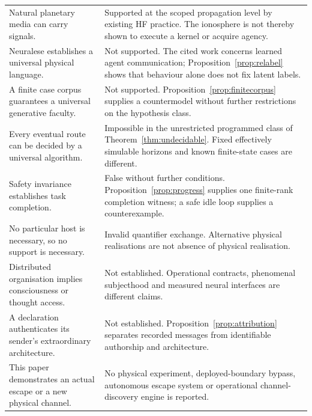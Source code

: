 \begin{longtable}{@{}>{\raggedright\arraybackslash}p{}>{\raggedright\arraybackslash}p{}@{}}
Natural planetary media can carry signals. & Supported at the scoped propagation level by existing HF practice. The ionosphere is not thereby shown to execute a kernel or acquire agency. \\\addlinespace
Neuralese establishes a universal physical language. & Not supported. The cited work concerns learned agent communication; Proposition~\ref{prop:relabel} shows that behaviour alone does not fix latent labels. \\\addlinespace
A finite case corpus guarantees a universal generative faculty. & Not supported. Proposition~\ref{prop:finitecorpus} supplies a countermodel without further restrictions on the hypothesis class. \\\addlinespace
Every eventual route can be decided by a universal algorithm. & Impossible in the unrestricted programmed class of Theorem~\ref{thm:undecidable}. Fixed effectively simulable horizons and known finite-state cases are different. \\\addlinespace
Safety invariance establishes task completion. & False without further conditions. Proposition~\ref{prop:progress} supplies one finite-rank completion witness; a safe idle loop supplies a counterexample. \\\addlinespace
No particular host is necessary, so no support is necessary. & Invalid quantifier exchange. Alternative physical realisations are not absence of physical realisation. \\\addlinespace
Distributed organisation implies consciousness or thought access. & Not established. Operational contracts, phenomenal subjecthood and measured neural interfaces are different claims. \\\addlinespace
A declaration authenticates its sender's extraordinary architecture. & Not established. Proposition~\ref{prop:attribution} separates recorded messages from identifiable authorship and architecture. \\\addlinespace
This paper demonstrates an actual escape or a new physical channel. & No physical experiment, deployed-boundary bypass, autonomous escape system or operational channel-discovery engine is reported. \\
\bottomrule
\end{longtable}
\endgroup
